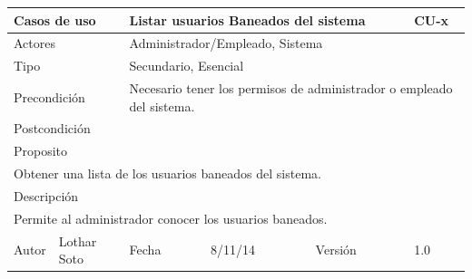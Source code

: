 \documentclass{article}
\begin{document}
\begin{table}[h]
\begin{tabular}{|l|l|l|l|l|l|}
\hline
\multicolumn{2}{|p{2cm}|}{Casos de uso}  & \multicolumn{3}{p{7cm}|}{Listar usuarios Baneados del sistema} & CU-x \\
\hline
\multicolumn{2}{|p{2cm}|}{Actores}       & \multicolumn{4}{p{8cm}|}{Administrador/Empleado, Sistema}        \\
\hline
\multicolumn{2}{|p{2cm}|}{Tipo}          & \multicolumn{4}{p{8cm}|}{Secundario, Esencial}        \\
\hline
\multicolumn{2}{|p{2cm}|}{Precondición}  & \multicolumn{4}{p{8cm}|}{Necesario tener los permisos de administrador o empleado del sistema.}        \\
\hline
\multicolumn{2}{|p{2cm}|}{Postcondición} & \multicolumn{4}{p{8cm}|}{}        \\
\hline
\multicolumn{6}{|p{10cm}|}{Proposito}                                   \\
\hline
\multicolumn{6}{|p{10cm}|}{Obtener una lista de los usuarios baneados del sistema.}                                            \\
\hline
\multicolumn{6}{|p{10cm}|}{Descripción}                                 \\
\hline
\multicolumn{6}{|p{10cm}|}{Permite al administrador conocer los usuarios baneados.}                                            \\
\hline
Autor          &       Lothar Soto        & Fecha    &  8/11/14   &   Versión  & 1.0\\    
\hline
\end{tabular}
\end{table}
\clearpage
\end{document}
